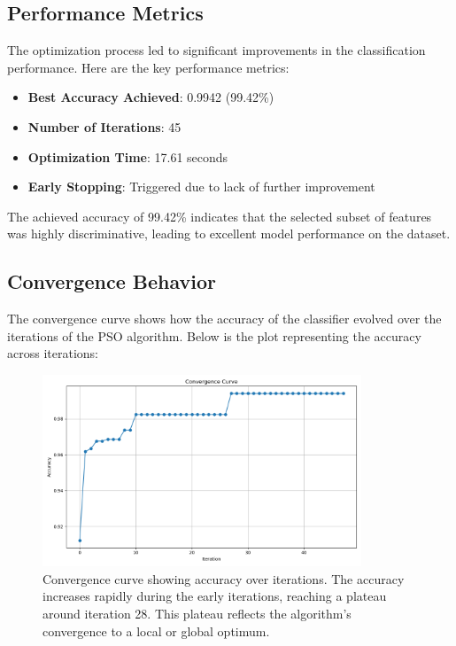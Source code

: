 \documentclass[12pt]{article}
\begin{document}
\subsection{Performance Metrics}

The optimization process led to significant improvements in the classification performance. Here are the key performance metrics:

\begin{itemize}
    \item \textbf{Best Accuracy Achieved}: 0.9942 (99.42\%)
    \item \textbf{Number of Iterations}: 45
    \item \textbf{Optimization Time}: 17.61 seconds
    \item \textbf{Early Stopping}: Triggered due to lack of further improvement
\end{itemize}

The achieved accuracy of 99.42\% indicates that the selected subset of features was highly discriminative, leading to excellent model performance on the dataset.

\subsection{Convergence Behavior}

The convergence curve shows how the accuracy of the classifier evolved over the iterations of the PSO algorithm. Below is the plot representing the accuracy across iterations:

\begin{figure}[H]
    \centering
    \includegraphics[width=0.85\textwidth]{convergence_curve.png}
    \caption{Convergence curve showing accuracy over iterations. The accuracy increases rapidly during the early iterations, reaching a plateau around iteration 28. This plateau reflects the algorithm’s convergence to a local or global optimum.}
    \label{fig:convergence}
\end{figure}
\end{document}
